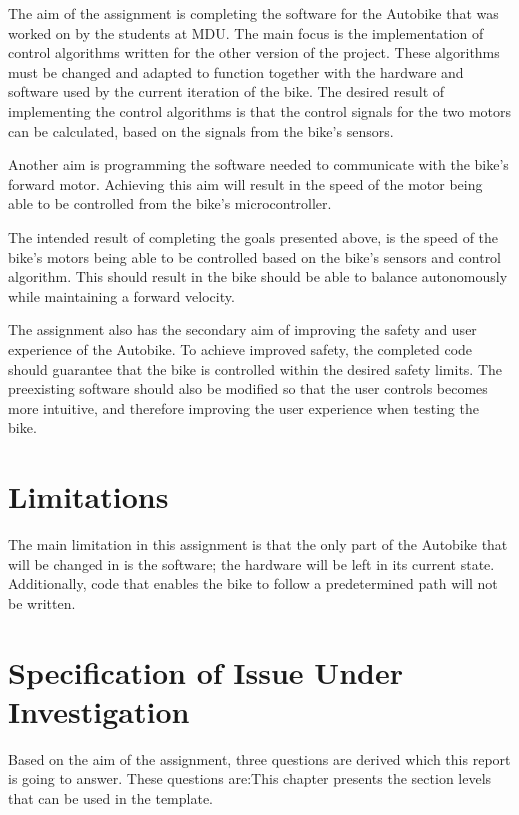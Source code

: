 The aim of the assignment is completing the software for the Autobike that was worked on by the students at MDU. The main focus is the implementation of control algorithms written for the other version of the project. These algorithms must be changed and adapted to function together with the hardware and software used by the current iteration of the bike. The desired result of implementing the control algorithms is that the control signals for the two motors can be calculated, based on the signals from the bike's sensors.

Another aim is programming the software needed to communicate with the bike's forward motor. Achieving this aim will result in the speed of the motor being able to be controlled from the bike's microcontroller.

The intended result of completing the goals presented above, is the speed of the bike's motors being able to be controlled based on the bike's sensors and control algorithm. This should result in the bike should be able to balance autonomously while maintaining a forward velocity.

The assignment also has the secondary aim of improving the safety and user experience of the Autobike. To achieve improved safety, the completed code should guarantee that the bike is controlled within the desired safety limits. The preexisting software should also be modified so that the user controls becomes more intuitive, and therefore improving the user experience when testing the bike.

\section{Limitations}

The main limitation in this assignment is that the only part of the Autobike that will be changed in is the software; the hardware will be left in its current state. Additionally, code that enables the bike to follow a predetermined path will not be written.

\section{Specification of Issue Under Investigation}

Based on the aim of the assignment, three questions are derived which this report is going to answer. These questions are:This chapter presents the section levels that can be used in the template.



